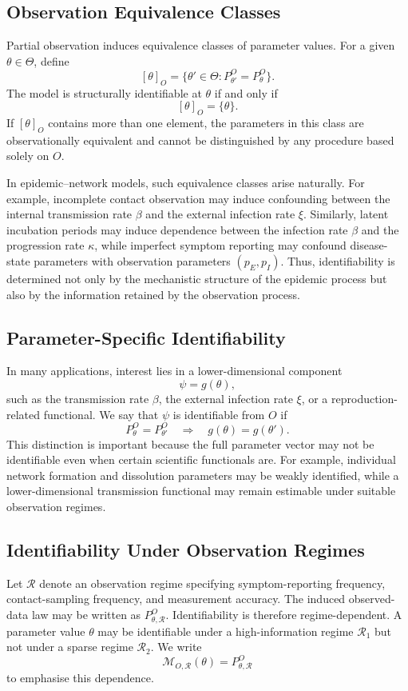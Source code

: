 \documentclass[10pt]{article}
\begin{document}
\subsection{Observation Equivalence Classes}

Partial observation induces equivalence classes of parameter values. For a given $\theta\in\Theta$, define
\[
[\theta]_O
=
\{\theta'\in\Theta:P_{\theta'}^O=P_\theta^O\}.
\]
The model is structurally identifiable at $\theta$ if and only if
\[
[\theta]_O=\{\theta\}.
\]
If $[\theta]_O$ contains more than one element, the parameters in this class are observationally equivalent and cannot be distinguished by any procedure based solely on $O$.

In epidemic--network models, such equivalence classes arise naturally. For example, incomplete contact observation may induce confounding between the internal transmission rate $\beta$ and the external infection rate $\xi$. Similarly, latent incubation periods may induce dependence between the infection rate $\beta$ and the progression rate $\kappa$, while imperfect symptom reporting may confound disease-state parameters with observation parameters $(p_E,p_I)$. Thus, identifiability is determined not only by the mechanistic structure of the epidemic process but also by the information retained by the observation process.

\subsection{Parameter-Specific Identifiability}
In many applications, interest lies in a lower-dimensional component
\[
\psi=g(\theta),
\]
such as the transmission rate $\beta$, the external infection rate $\xi$, or a reproduction-related functional. We say that $\psi$ is identifiable from $O$ if
\[
P_\theta^O=P_{\theta'}^O
\quad\Longrightarrow\quad
g(\theta)=g(\theta').
\]
This distinction is important because the full parameter vector may not be identifiable even when certain scientific functionals are. For example, individual network formation and dissolution parameters may be weakly identified, while a lower-dimensional transmission functional may remain estimable under suitable observation regimes.

\subsection{Identifiability Under Observation Regimes}
Let $\mathcal{R}$ denote an observation regime specifying symptom-reporting frequency, contact-sampling frequency, and measurement accuracy. The induced observed-data law may be written as $P_{\theta,\mathcal{R}}^O$. Identifiability is therefore regime-dependent. A parameter value $\theta$ may be identifiable under a high-information regime $\mathcal{R}_1$ but not under a sparse regime $\mathcal{R}_2$. We write
\[
\mathcal{M}_{O,\mathcal{R}}(\theta)=P_{\theta,\mathcal{R}}^O
\]
to emphasise this dependence.
\end{document}
